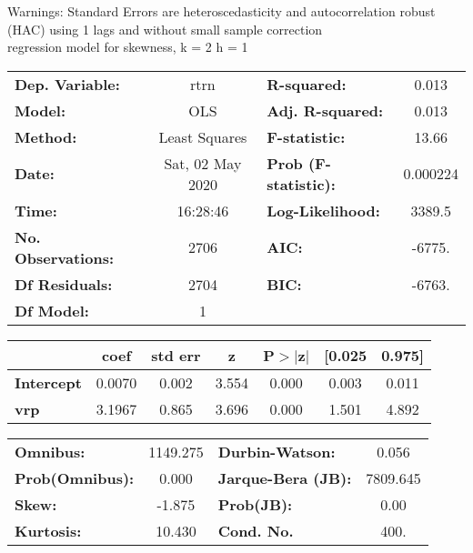 Warnings: \newline
 [1] Standard Errors are heteroscedasticity and autocorrelation robust (HAC) using 1 lags and without small sample correction\\ 

regression model for skewness, k = 2 h = 1\begin{center}
\begin{tabular}{lclc}
\toprule
\textbf{Dep. Variable:}    &       rtrn       & \textbf{  R-squared:         } &     0.013   \\
\textbf{Model:}            &       OLS        & \textbf{  Adj. R-squared:    } &     0.013   \\
\textbf{Method:}           &  Least Squares   & \textbf{  F-statistic:       } &     13.66   \\
\textbf{Date:}             & Sat, 02 May 2020 & \textbf{  Prob (F-statistic):} &  0.000224   \\
\textbf{Time:}             &     16:28:46     & \textbf{  Log-Likelihood:    } &    3389.5   \\
\textbf{No. Observations:} &        2706      & \textbf{  AIC:               } &    -6775.   \\
\textbf{Df Residuals:}     &        2704      & \textbf{  BIC:               } &    -6763.   \\
\textbf{Df Model:}         &           1      & \textbf{                     } &             \\
\bottomrule
\end{tabular}
\begin{tabular}{lcccccc}
                   & \textbf{coef} & \textbf{std err} & \textbf{z} & \textbf{P$> |$z$|$} & \textbf{[0.025} & \textbf{0.975]}  \\
\midrule
\textbf{Intercept} &       0.0070  &        0.002     &     3.554  &         0.000        &        0.003    &        0.011     \\
\textbf{vrp}       &       3.1967  &        0.865     &     3.696  &         0.000        &        1.501    &        4.892     \\
\bottomrule
\end{tabular}
\begin{tabular}{lclc}
\textbf{Omnibus:}       & 1149.275 & \textbf{  Durbin-Watson:     } &    0.056  \\
\textbf{Prob(Omnibus):} &   0.000  & \textbf{  Jarque-Bera (JB):  } & 7809.645  \\
\textbf{Skew:}          &  -1.875  & \textbf{  Prob(JB):          } &     0.00  \\
\textbf{Kurtosis:}      &  10.430  & \textbf{  Cond. No.          } &     400.  \\
\bottomrule
\end{tabular}
\end{center}

